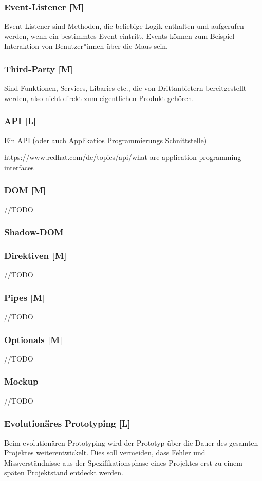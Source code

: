 \subsubsection{Event-Listener [M]}
\label{txt:glos:event-listener}
Event-Listener sind Methoden, die beliebige Logik enthalten und aufgerufen werden, wenn ein bestimmtes Event eintritt. Events können zum Beispiel Interaktion von Benutzer*innen über die Maus sein. 

\subsubsection{Third-Party [M]}
Sind Funktionen, Services, Libaries etc., die von Drittanbietern bereitgestellt werden, also nicht direkt zum eigentlichen Produkt gehören. 

\subsubsection{API [L]}
\label{txt:glos:API}
Ein API (oder auch Applikatios Programmierungs Schnittstelle)

https://www.redhat.com/de/topics/api/what-are-application-programming-interfaces

\subsubsection{DOM [M]}
\label{txt:glos:DOM}
//TODO 
\subsubsection{Shadow-DOM}


\subsubsection{Direktiven [M]}
//TODO

\subsubsection{Pipes [M]}
//TODO

\subsubsection{Optionals [M]}
//TODO

\subsubsection{Mockup}
//TODO


\subsubsection{Evolutionäres Prototyping [L]}
\label{ch::ongoing-prototyping}
Beim evolutionären Prototyping wird der Prototyp über die Dauer des gesamten Projektes weiterentwickelt. Dies soll vermeiden, dass Fehler und Missverständnisse aus der Spezifikationsphase eines Projektes erst zu einem späten Projektstand entdeckt werden. \cite{Prototyping}